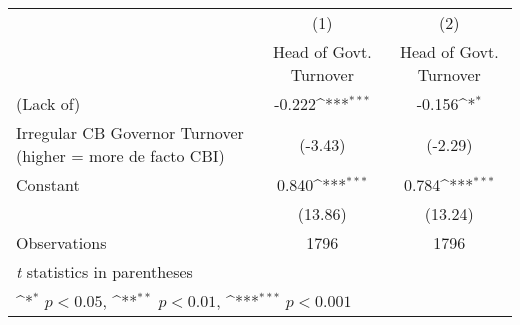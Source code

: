 {
\def\sym#1{\ifmmode^{#1}\else\(^{#1}\)\fi}
\begin{tabular}{l*{2}{c}}
\toprule
                &\multicolumn{1}{c}{(1)}&\multicolumn{1}{c}{(2)}\\
                &\multicolumn{1}{c}{Head of Govt. Turnover}&\multicolumn{1}{c}{Head of Govt. Turnover}\\
\midrule
(Lack of)       &   -0.222\sym{***}&   -0.156\sym{*}  \\
Irregular CB Governor Turnover (higher = more de facto CBI)&  (-3.43)         &  (-2.29)         \\
\addlinespace
Constant        &    0.840\sym{***}&    0.784\sym{***}\\
                &  (13.86)         &  (13.24)         \\
\midrule
Observations    &     1796         &     1796         \\
\bottomrule
\multicolumn{3}{l}{\footnotesize \textit{t} statistics in parentheses}\\
\multicolumn{3}{l}{\footnotesize \sym{*} \(p<0.05\), \sym{**} \(p<0.01\), \sym{***} \(p<0.001\)}\\
\end{tabular}
}
